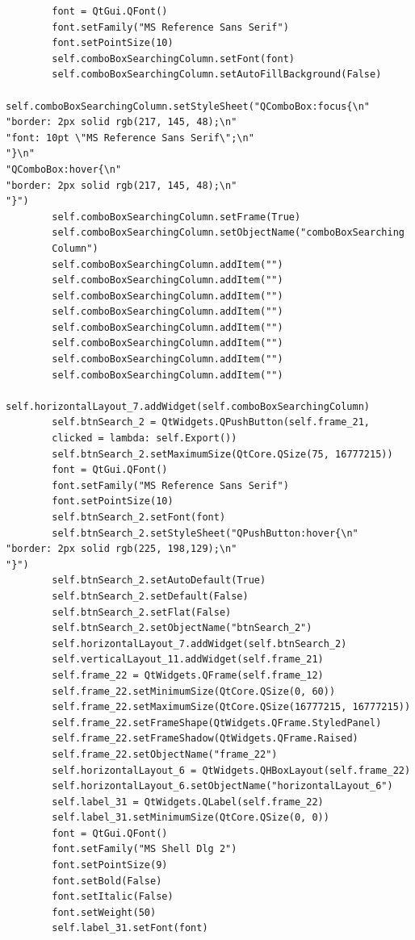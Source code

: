 \documentclass[12pt]{article}
\begin{document}
\begin{verbatim}
        font = QtGui.QFont()
        font.setFamily("MS Reference Sans Serif")
        font.setPointSize(10)
        self.comboBoxSearchingColumn.setFont(font)
        self.comboBoxSearchingColumn.setAutoFillBackground(False)
        self.comboBoxSearchingColumn.setStyleSheet("QComboBox:focus{\n"
"border: 2px solid rgb(217, 145, 48);\n"
"font: 10pt \"MS Reference Sans Serif\";\n"
"}\n"
"QComboBox:hover{\n"
"border: 2px solid rgb(217, 145, 48);\n"
"}")
        self.comboBoxSearchingColumn.setFrame(True)
        self.comboBoxSearchingColumn.setObjectName("comboBoxSearching
        Column")
        self.comboBoxSearchingColumn.addItem("")
        self.comboBoxSearchingColumn.addItem("")
        self.comboBoxSearchingColumn.addItem("")
        self.comboBoxSearchingColumn.addItem("")
        self.comboBoxSearchingColumn.addItem("")
        self.comboBoxSearchingColumn.addItem("")
        self.comboBoxSearchingColumn.addItem("")
        self.comboBoxSearchingColumn.addItem("")
        self.horizontalLayout_7.addWidget(self.comboBoxSearchingColumn)
        self.btnSearch_2 = QtWidgets.QPushButton(self.frame_21, 
        clicked = lambda: self.Export())
        self.btnSearch_2.setMaximumSize(QtCore.QSize(75, 16777215))
        font = QtGui.QFont()
        font.setFamily("MS Reference Sans Serif")
        font.setPointSize(10)
        self.btnSearch_2.setFont(font)
        self.btnSearch_2.setStyleSheet("QPushButton:hover{\n"
"border: 2px solid rgb(225, 198,129);\n"
"}")
        self.btnSearch_2.setAutoDefault(True)
        self.btnSearch_2.setDefault(False)
        self.btnSearch_2.setFlat(False)
        self.btnSearch_2.setObjectName("btnSearch_2")
        self.horizontalLayout_7.addWidget(self.btnSearch_2)
        self.verticalLayout_11.addWidget(self.frame_21)
        self.frame_22 = QtWidgets.QFrame(self.frame_12)
        self.frame_22.setMinimumSize(QtCore.QSize(0, 60))
        self.frame_22.setMaximumSize(QtCore.QSize(16777215, 16777215))
        self.frame_22.setFrameShape(QtWidgets.QFrame.StyledPanel)
        self.frame_22.setFrameShadow(QtWidgets.QFrame.Raised)
        self.frame_22.setObjectName("frame_22")
        self.horizontalLayout_6 = QtWidgets.QHBoxLayout(self.frame_22)
        self.horizontalLayout_6.setObjectName("horizontalLayout_6")
        self.label_31 = QtWidgets.QLabel(self.frame_22)
        self.label_31.setMinimumSize(QtCore.QSize(0, 0))
        font = QtGui.QFont()
        font.setFamily("MS Shell Dlg 2")
        font.setPointSize(9)
        font.setBold(False)
        font.setItalic(False)
        font.setWeight(50)
        self.label_31.setFont(font)

\end{verbatim}
\end{document}
